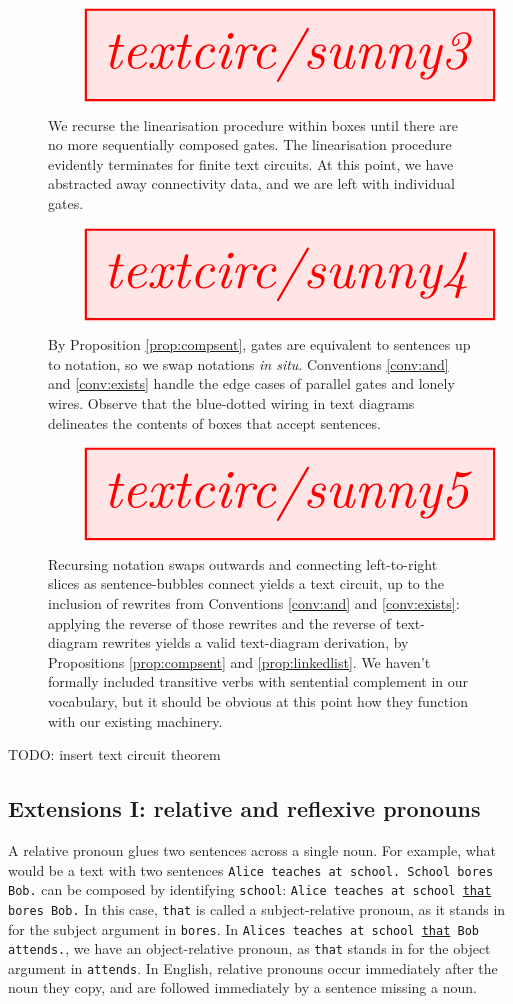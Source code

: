 \begin{construction}
\begin{figure}[h!]
\centering
\[
\resizebox{\textwidth}{!}{\tikzfig{textcirc/sunny3}}
\]
\caption{We recurse the linearisation procedure within boxes until there are no more sequentially composed gates. The linearisation procedure evidently terminates for finite text circuits. At this point, we have abstracted away connectivity data, and we are left with individual gates.}
\end{figure}

\begin{figure}[h!]
\centering
\[
\resizebox{\textwidth}{!}{\tikzfig{textcirc/sunny4}}
\]
\caption{By Proposition \ref{prop:compsent}, gates are equivalent to sentences up to notation, so we swap notations \emph{in situ}. Conventions \ref{conv:and} and \ref{conv:exists} handle the edge cases of parallel gates and lonely wires. Observe that the blue-dotted wiring in text diagrams delineates the contents of boxes that accept sentences.}
\end{figure}

\begin{figure}[h!]
\centering
\[
\resizebox{\textwidth}{!}{\tikzfig{textcirc/sunny5}}
\]
\caption{Recursing notation swaps outwards and connecting left-to-right slices as sentence-bubbles connect yields a text circuit, up to the inclusion of rewrites from Conventions \ref{conv:and} and \ref{conv:exists}: applying the reverse of those rewrites and the reverse of text-diagram rewrites yields a valid text-diagram derivation, by Propositions \ref{prop:compsent} and \ref{prop:linkedlist}. We haven't formally included transitive verbs with sentential complement in our vocabulary, but it should be obvious at this point how they function with our existing machinery.}
\end{figure}
\end{construction}

\bR TODO: insert text circuit theorem \e

\newpage
\subsection{Extensions I: relative and reflexive pronouns}


A relative pronoun glues two sentences across a single noun. For example, what would be a text with two sentences \texttt{Alice teaches at school. School bores Bob.} can be composed by identifying \texttt{school}: \texttt{Alice teaches at school \underline{that} bores Bob.} In this case, \texttt{that} is called a subject-relative pronoun, as it stands in for the subject argument in \texttt{bores}. In \texttt{Alices teaches at school \underline{that} Bob attends.}, we have an object-relative pronoun, as \texttt{that} stands in for the object argument in \texttt{attends}. In English, relative pronouns occur immediately after the noun they copy, and are followed immediately by a sentence missing a noun.

